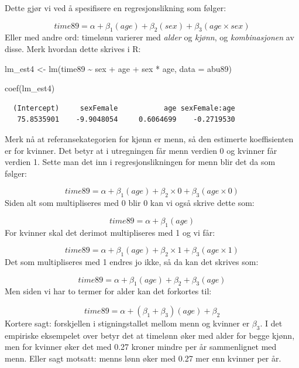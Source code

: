 \documentclass[
  norsk,
  letterpaper,
  DIV=11,
  numbers=noendperiod]{scrreprt}
\newenvironment{Shaded}{\begin{snugshade}}{\end{snugshade}}
\newcommand{\AttributeTok}[1]{\textcolor[rgb]{0.40,0.45,0.13}{#1}}
\newcommand{\FunctionTok}[1]{\textcolor[rgb]{0.28,0.35,0.67}{#1}}
\newcommand{\NormalTok}[1]{\textcolor[rgb]{0.00,0.23,0.31}{#1}}
\newcommand{\OtherTok}[1]{\textcolor[rgb]{0.00,0.23,0.31}{#1}}
\newcommand{\SpecialCharTok}[1]{\textcolor[rgb]{0.37,0.37,0.37}{#1}}
\theoremstyle{definition}
\theoremstyle{remark}
\begin{document}
Dette gjør vi ved å spesifisere en regresjonslikning som følger:

\[
time89 = \alpha + \beta_{1}(age) + \beta_{2}(sex) + \beta_{3}(age \times sex)
\] Eller med andre ord: timelønn varierer med \emph{alder} og
\emph{kjønn}, og \emph{kombinasjonen} av disse. Merk hvordan dette
skrives i R:

\begin{Shaded}
\begin{Highlighting}[]
\NormalTok{lm\_est4 }\OtherTok{\textless{}{-}} \FunctionTok{lm}\NormalTok{(time89 }\SpecialCharTok{\textasciitilde{}}\NormalTok{ sex }\SpecialCharTok{+}\NormalTok{ age }\SpecialCharTok{+}\NormalTok{ sex }\SpecialCharTok{*}\NormalTok{ age, }\AttributeTok{data =}\NormalTok{ abu89)}

\FunctionTok{coef}\NormalTok{(lm\_est4)}
\end{Highlighting}
\end{Shaded}

\begin{verbatim}
  (Intercept)     sexFemale           age sexFemale:age 
   75.8535901    -9.9048054     0.6064699    -0.2719530 
\end{verbatim}

Merk nå at referansekategorien for kjønn er menn, så den estimerte
koeffisienten er for kvinner. Det betyr at i utregningen får menn
verdien 0 og kvinner får verdien 1. Sette man det inn i
regresjonslikningen for menn blir det da som følger:

\[
time89 = \alpha + \beta_{1}(age) + \beta_{2}\times 0 + \beta_{3}(age \times 0)
\] Siden alt som multipliseres med 0 blir 0 kan vi også skrive dette
som:

\[
time89 = \alpha + \beta_{1}(age) 
\] For kvinner skal det derimot multipliseres med 1 og vi får:

\[
time89 = \alpha + \beta_{1}(age) + \beta_{2}\times 1 + \beta_{3}(age \times 1)
\] Det som multipliseres med 1 endres jo ikke, så da kan det skrives
som:

\[
time89 = \alpha + \beta_{1}(age) + \beta_{2} + \beta_{3}(age)
\] Men siden vi har to termer for alder kan det forkortes til:

\[
time89 = \alpha + (\beta_{1} + \beta_{3})(age) + \beta_{2} 
\] Kortere sagt: forskjellen i stigningstallet mellom menn og kvinner er
\(\beta_{3}\). I det empiriske eksempelet over betyr det at timelønn
øker med alder for begge kjønn, men for kvinner øker det med 0.27 kroner
mindre per år sammenlignet med menn. Eller sagt motsatt: menns lønn øker
med 0.27 mer enn kvinner per år.
\end{document}
